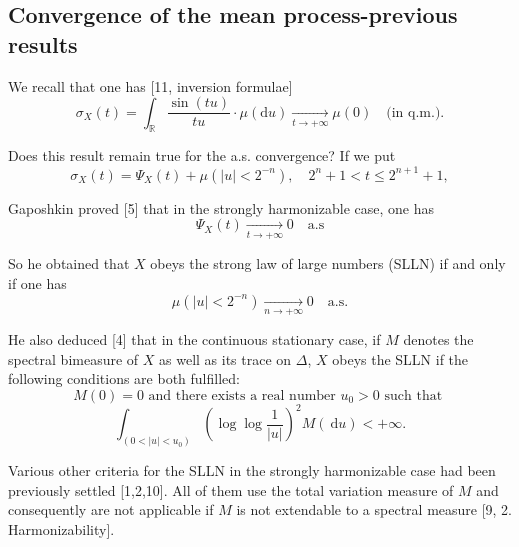 \documentclass{article}
\theoremstyle{definition}
\begin{document}
\subsection{Convergence of the mean process-previous results}

We recall that one has [11, inversion formulae]
\begin{equation}\label{eq:9}
\sigma_{X}(t)=\int_{\mathbb{R}} \frac{\sin (t u)}{t u} \cdot \mu(\mathrm{d} u) \underset{t\rightarrow+\infty}{\longrightarrow} \mu(0) \quad \text{(in q.m.).}
\end{equation}

Does this result remain true for the a.s. convergence?
If we put
\begin{equation}\label{eq:10}
\sigma_{X}(t)=\Psi_{X}(t)+\mu\left(|u|<2^{-n}\right), \quad 2^{n}+1<t \leqslant 2^{n+1}+1,
\end{equation}

Gaposhkin proved [5] that in the strongly harmonizable case, one has
\begin{equation}\label{eq:11}
\Psi_{X}(t) \underset{t \rightarrow+\infty}{\longrightarrow} 0 \quad \text{a.s}
\end{equation}

So he obtained that $X$ obeys the strong law of large numbers (SLLN) if and only if one has
\begin{equation}\label{eq:12}
\mu\left(|u|<2^{-n}\right) \underset{n \rightarrow+\infty}{\longrightarrow} 0 \quad \text{a.s.}
\end{equation}

He also deduced [4] that in the continuous stationary case, if $M$ denotes the spectral bimeasure of $X$ as well as its trace on $\Delta$, $X$ obeys the SLLN if the following conditions are both fulfilled:
\begin{equation}\label{eq:13}
M(0)=0 \text{ and there exists a real number } u_{0}>0 \text{ such that }
\end{equation}
\begin{equation}\label{eq:14}
\int_{\left(0<|u|<u_{0}\right)}\left(\log \log \frac{1}{|u|}\right)^{2} M(\mathrm{~d} u)<+\infty.
\end{equation}

Various other criteria for the SLLN in the strongly harmonizable case had been previously settled [1,2,10]. All of them use the total variation measure of $M$ and consequently are not applicable if $M$ is not extendable to a spectral measure [9, 2. Harmonizability].
\end{document}
